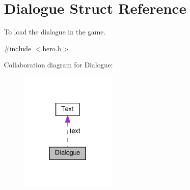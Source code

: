 \hypertarget{structDialogue}{}\section{Dialogue Struct Reference}
\label{structDialogue}


To load the dialogue in the game.  




{\ttfamily \#include $<$hero.\+h$>$}



Collaboration diagram for Dialogue\+:\nopagebreak
\begin{figure}[H]
\begin{center}
\leavevmode
\includegraphics[width=135pt]{structDialogue__coll__graph}
\end{center}
\end{figure}
